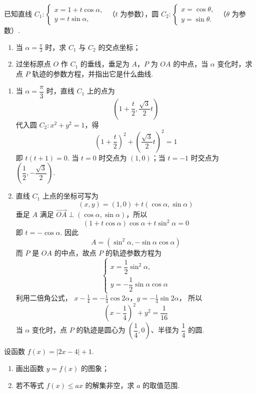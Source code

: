 \begin{problem}
已知直线 \(C_1: \begin{cases}
x = 1 + t\cos \alpha,\\
y = t\sin \alpha,
\end{cases}\) （\(t\) 为参数），圆 \(C_2: \begin{cases}
x = \cos \theta,\\
y = \sin \theta.
\end{cases}\) （\(\theta\) 为参数）.

\begin{enumerate}
\item 当 \(\alpha = \frac{\pi}{3}\) 时，求 \(C_1\) 与 \(C_2\) 的交点坐标；
\item 过坐标原点 \(O\) 作 \(C_{1}\) 的垂线，垂足为 \(A\)，\(P\) 为 \(OA\) 的中点，当 \(\alpha\) 变化时，求点 \(P\) 轨迹的参数方程，并指出它是什么曲线.
\end{enumerate}
\end{problem}

\begin{solution}
\begin{enumerate}
\item 当 \(\alpha=\dfrac{\pi}{3}\) 时，直线 \(C_1\) 上的点为
\[
\left(1+\frac{t}{2},\frac{\sqrt{3}}{2}t\right)
\]
代入圆 \(C_2:x^2+y^2=1\)，得
\[
\left(1+\frac{t}{2}\right)^2+\left(\frac{\sqrt{3}}{2}t\right)^2=1
\]
即 \(t(t+1)=0\). 当 \(t=0\) 时交点为 \((1,0)\)；当 \(t=-1\) 时交点为 \(\left(\dfrac12,-\dfrac{\sqrt{3}}2\right)\).

\item 直线 \(C_1\) 上点的坐标可写为
\[
(x,y)=(1,0)+t(\cos\alpha,\sin\alpha)
\]
垂足 \(A\) 满足 \(\overrightarrow{OA}\perp(\cos\alpha,\sin\alpha)\)，所以
\[
(1+t\cos\alpha)\cos\alpha+t\sin^2\alpha=0
\]
即 \(t=-\cos\alpha\). 因此
\[
A=(\sin^2\alpha,-\sin\alpha\cos\alpha)
\]
而 \(P\) 是 \(OA\) 的中点，故点 \(P\) 的轨迹参数方程为
\[
\begin{cases}
x=\dfrac12\sin^2\alpha,\\
y=-\dfrac12\sin\alpha\cos\alpha
\end{cases}
\]
利用二倍角公式，
\(x-\frac14=-\frac14\cos2\alpha\)，\(y=-\frac14\sin2\alpha\)，
所以
\[
\left(x-\frac14\right)^2+y^2=\frac1{16}
\]
当 \(\alpha\) 变化时，点 \(P\) 的轨迹是圆心为 \(\left(\dfrac14,0\right)\)、半径为 \(\dfrac14\) 的圆.
\end{enumerate}
\end{solution}

\begin{problem}
设函数 \( f(x) = |2x - 4| + 1 \).

\begin{enumerate}
\item 画出函数 \( y = f(x) \) 的图象；
\item 若不等式 \( f(x) \leqslant ax \) 的解集非空，求 \( a \) 的取值范围.
\end{enumerate}

\end{problem}

